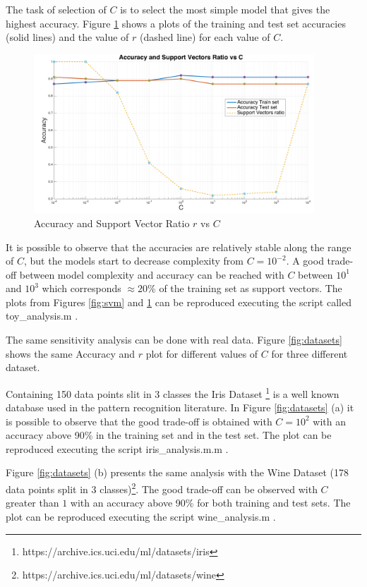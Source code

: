 The task of selection of $C$ is to select the most simple model that gives the highest accuracy.
Figure \ref{fig:toy} shows a plots of the training and test set accuracies (solid lines) and the value of $r$ (dashed line) for each value of $C$.

\begin{figure}[!htb]
\begin{center}
\includegraphics [width=10.5cm] {./graphics/toy_plot.png}
\caption{Accuracy and Support Vector Ratio $r$ vs $C$} \label{fig:toy}
\end{center}
\end{figure}

It is possible to observe that the accuracies are relatively stable along the range of $C$, but the models start to decrease complexity from $C=10^{-2}$.
A good trade-off between model complexity and accuracy can be reached with $C$ between $10^1$ and $10^3$ which corresponds $\approx 20\%$ of the training set as support vectors. 
The plots from Figures \ref{fig:svm} and \ref{fig:toy} can be reproduced executing the script called toy\_analysis.m .

The same sensitivity analysis can be done with real data.
Figure \ref{fig:datasets} shows the same Accuracy and $r$ plot for different values of $C$ for three different dataset.


Containing 150 data points slit in 3 classes the Iris Dataset \footnote{https://archive.ics.uci.edu/ml/datasets/iris} is a well known database used in the pattern recognition literature.
In Figure \ref{fig:datasets} (a) it is possible to observe that the good trade-off is obtained with $C=10^2$ with an accuracy above 90\% in the training set and in the test set.
The plot can be reproduced executing the script iris\_analysis.m.m .

Figure \ref{fig:datasets} (b) presents the same analysis with the Wine Dataset (178 data points split in 3 classes)\footnote{https://archive.ics.uci.edu/ml/datasets/wine}.
The good trade-off can be observed with $C$ greater than $1$ with an accuracy above 90\% for both training and test sets.
The plot can be reproduced executing the script wine\_analysis.m .

